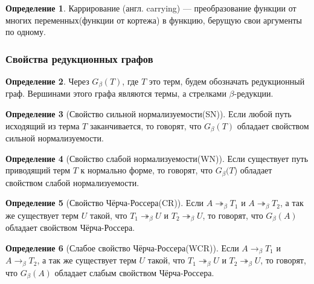 \documentclass[10pt,twoside]{article}
\theoremstyle{plain}
\theoremstyle{definition}
\newtheorem{defi}{Определение}
\begin{document}
\begin{defi}
  Каррирование (англ. carrying) — преобразование функции от многих переменных(функции от кортежа) в функцию, берущую свои аргументы по одному.
\end{defi}

\subsubsection{Свойства редукционных графов}

\begin{defi}
  Через $G_\beta(T)$, где $T$ это терм, будем обозначать редукционный граф. Вершинами этого графа являются термы, а стрелками $\beta$-редукции.
\end{defi}

\begin{defi}[Свойство сильной нормализуемости(SN)]
  Если любой путь исходящий из терма $T$ заканчивается, то говорят, что $G_\beta(T)$ обладает свойством сильной нормализуемости.
\end{defi}

\begin{defi}[Свойство слабой нормализуемости(WN)]
  Если существует путь приводящий терм $T$ к нормально форме, то говорят, что $G_\beta(T$) обладает свойством слабой нормализуемости.
\end{defi}

\begin{defi}[Свойство Чёрча-Россера(CR)]
  Если $A\twoheadrightarrow_\beta T_1$ и $A\twoheadrightarrow_\beta T_2$, а так же существует терм $U$ такой, что $T_1\twoheadrightarrow_\beta U$ и $T_2\twoheadrightarrow_\beta U$, то говорят, что $G_\beta(A)$ обладает свойством Чёрча-Россера.
\end{defi}

\begin{defi}[Слабое свойство Чёрча-Россера(WCR)]
  Если $A\to_\beta T_1$ и $A\to_\beta T_2$, а так же существует терм $U$ такой, что $T_1\twoheadrightarrow_\beta U$ и $T_2\twoheadrightarrow_\beta U$, то говорят, что $G_\beta(A)$ обладает слабым свойством Чёрча-Россера.
\end{defi}
\end{document}
